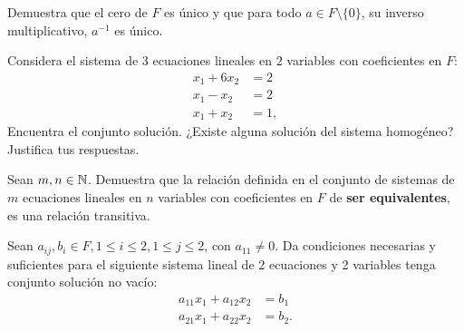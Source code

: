 \documentclass[12pt,a4paper]{book}
\begin{document}
    \begin{ejercicio}
        Demuestra que el cero de $F$ es único y que para todo $a \in F \setminus \{ 0 \}$, su inverso multiplicativo, $a^{-1}$ es único.
    \end{ejercicio}

    \begin{ejercicio}
        Considera el sistema de $3$ ecuaciones lineales en $2$ variables con coeficientes en $F$:
        \begin{align}
            x_{1} + 6x_{2} & = 2 \tag{2.1}\\
            x_{1} - x_{2} & = 2 \tag{2.2}\\
            x_{1} + x_{2} & = 1, \tag{2.3}
        \end{align}
        Encuentra el conjunto solución. ¿Existe alguna solución del sistema homogéneo? Justifica tus respuestas.
    \end{ejercicio}

    \begin{ejercicio}
        Sean $m,n \in \mathbb{N}$. Demuestra que la relación definida en el conjunto de sistemas de $m$ ecuaciones lineales en $n$ variables con coeficientes en $F$ de \textbf{ser equivalentes}, es una relación transitiva.
    \end{ejercicio}

    \begin{ejercicio}
        Sean $a_{ij}, b_{i} \in F, 1 \leq i \leq 2, 1 \leq j \leq 2$, con $a_{11} \neq 0$. Da condiciones necesarias y suficientes para el siguiente sistema lineal de 2 ecuaciones y 2 variables tenga conjunto solución no vacío:
        \begin{align}
            a_{11}x_{1} + a_{12}x_{2} & = b_{1} \\
            a_{21}x_{1} + a_{22}x_{2} & = b_{2}.
        \end{align}
    \end{ejercicio}

    \vspace{2cm}
\end{document}
